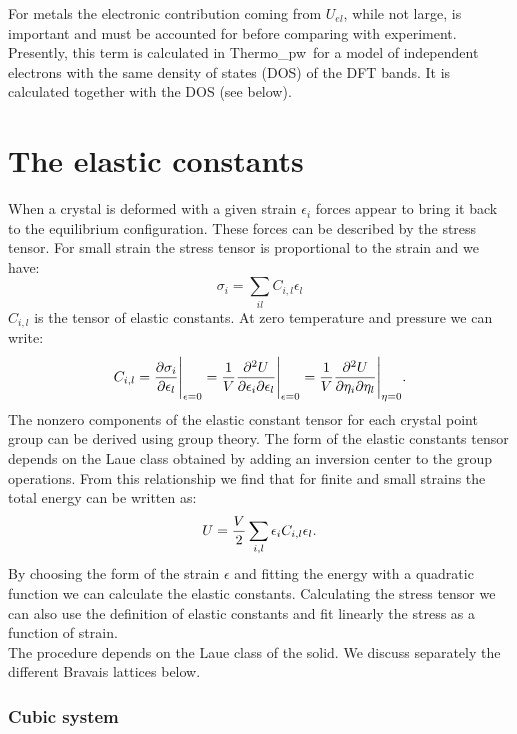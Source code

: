 \documentclass[12pt,a4paper,twoside]{report}
\def\tpw{{\sc Thermo}\_{\sc pw}}
\begin{document}
For metals the electronic contribution coming from $U_{el}$, while not large, 
is important 
and must be accounted for before comparing with experiment. Presently,
this term is calculated in \tpw\ for a model of independent electrons with
the same density of states (DOS) of the DFT bands. It is calculated together 
with the DOS (see below).

\newpage
{\color{dark-blue}\chapter{The elastic constants}}
\color{black}

When a crystal is deformed with a given strain $\epsilon_i$ forces
appear to bring it back to the equilibrium configuration. These
forces can be described by the stress tensor. For small strain the 
stress tensor is proportional to the strain and we have:
\begin{equation}
\sigma_{i} =\sum_{il} C_{i,l} \epsilon_l 
\end{equation}
$C_{i,l}$ is the tensor of elastic constants. 
At zero temperature and pressure we can write:
\begin{equation}
C_{i,l}= {\partial \sigma_i \over \partial \epsilon_{l}}\Bigg|_{\epsilon=0}=
{1 \over V}{\partial^2 U \over \partial \epsilon_i \partial \epsilon_l}
\Bigg|_{\epsilon=0} = 
{1 \over V}{\partial^2 U \over \partial \eta_i \partial \eta_l}
\Bigg|_{\eta=0}
.
\end{equation}
The nonzero components of the elastic constant tensor for each crystal point
group can be derived using group theory. The form of the elastic constants
tensor depends on the Laue class obtained by adding an inversion center to
the group operations. From this relationship we find that for finite
and small strains the total energy can be written as:
\begin{equation}
U= {V \over 2} \sum_{i,l} \epsilon_i C_{i,l} \epsilon_l.
\end{equation}
By choosing the form of the strain $\epsilon$ and fitting the
energy with a quadratic function we can calculate the elastic constants.
Calculating the stress tensor we can also use the definition
of elastic constants and fit linearly the stress as a function of strain. \\
The procedure depends on the Laue class of the solid. We discuss separately
the different Bravais lattices below.

{\color{web-blue}\subsection{Cubic system}}
\color{black}
\end{document}

